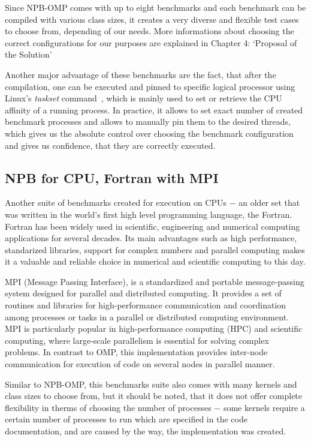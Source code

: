 Since NPB-OMP comes with up to eight benchmarks and each benchmark can be compiled
with various class sizes, it creates a very diverse and flexible test cases to
choose from, depending of our needs. More informations about choosing the correct
configurations for our purposes are explained in Chapter 4: `Proposal of the
Solution'

Another major advantage of these benchmarks are the fact, that after the
compilation, one can be executed and pinned to specific logical processor using
Linux's \emph{taskset} command~\cite{Linux_taskset}, which is mainly used to
set or retrieve the CPU affinity of a running process. In practice, it allows
to set exact number of created benchmark processes and allows to manually pin
them to the desired threads, which gives us the absolute control over choosing
the benchmark configuration and gives us confidence, that they are correctly
executed.

\subsection{NPB for CPU, Fortran with MPI}

Another suite of benchmarks created for execution on CPUs $-$ an older set that
was written in the world's first high level programming language, the Fortran.
Fortran has been widely used in scientific, engineering and numerical computing
applications for several decades. Its main advantages such as high performance,
standarized libraries, support for complex numbers and parallel computing makes
it a valuable and reliable choice in numerical and scientific computing to this
day.

MPI (Message Passing Interface), is a standardized and portable message-passing
system designed for parallel and distributed computing. It provides a set of
routines and libraries for high-performance communication and coordination among
processes or tasks in a parallel or distributed computing environment. MPI is
particularly popular in high-performance computing (HPC) and scientific computing,
where large-scale parallelism is essential for solving complex problems. In
contrast to OMP, this implementation provides inter-node communication for
execution of code on several nodes in parallel manner.

Similar to NPB-OMP, this benchmarks suite also comes with many kernels and class
sizes to choose from, but it should be noted, that it does not offer complete
flexibility in therms of choosing the number of processes $-$ some kernels
require a certain number of processes to run which are specified in the code
documentation, and are caused by the way, the implementation was created.

